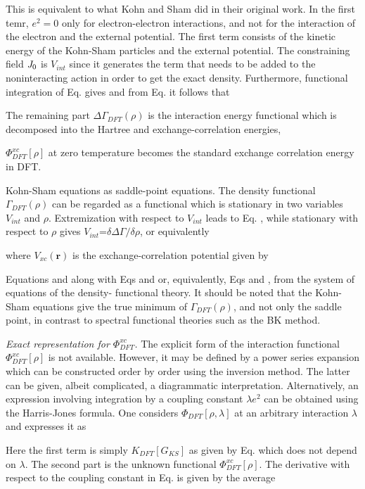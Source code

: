 \documentclass[12 pt]{article}
\begin{document}
{  This is equivalent to what Kohn and Sham did in their original work. In the first temr, $e^2 =0$ only 
for electron-electron interactions, and not for the interaction of the electron and the external potential. 
The first term consists of the kinetic energy of the Kohn-Sham particles and the external potential. The 
constraining field $\emph{J}_0$ is $V_{int}$ since it generates the term that needs to be added to the 
noninteracting action in order to get the exact density. Furthermore, functional integration of Eq. gives 
and from Eq. it follows that

  The remaining part $\Delta\Gamma_{DFT}(\rho)$ is the interaction energy functional which is decomposed 
into the Hartree and exchange-correlation energies,

  $\varPhi_{DFT}^{xc}[\rho]$ at zero temperature becomes the standard exchange correlation energy in DFT.

  Kohn-Sham equations as saddle-point equations. The density functional $\Gamma_{DFT}(\rho)$ can be regarded 
as a functional which is stationary in two variables $V_{int}$ and $\rho$. Extremization with respect to $V_{int}$ 
leads to Eq. , while stationary with respect to $\rho$ gives $V_{int}$=$\delta\Delta\Gamma/\delta\rho$, or 
equivalently

  where $V_{xc}(\textbf{r})$ is the exchange-correlation potential given by

  Equations and along with Eqs and or, equivalently, Eqs and , from the system of equations of the density-
functional theory. It should be noted that the Kohn-Sham equations give the true minimum of $\Gamma_{DFT}(\rho)$, 
and not only the saddle point, in contrast to spectral functional theories such as the BK method. 

  \emph{Exact representation for $\Phi_{DFT}^{xc}$.} The explicit form of the interaction functional 
$\Phi_{DFT}^{xc}[\rho]$ is not available. However, it may be defined by a power series expansion which can 
be constructed order by order using the inversion method. The latter can be given, albeit complicated, 
a diagrammatic interpretation. Alternatively, an expression involving integration by a coupling constant 
$\lambda e^2$ can be obtained using the Harris-Jones formula. One considers $\Phi_{DFT}[\rho, \lambda]$ at an 
arbitrary interaction $\lambda$ and expresses it as

  Here the first term is simply $K_{DFT}[G_{KS}]$ as given by Eq. which does not depend on $\lambda$. The second 
part is the unknown functional $\Phi_{DFT}^{xc}[\rho]$. The derivative with respect to the coupling constant in Eq. 
is given by the average

}
\end{document}
